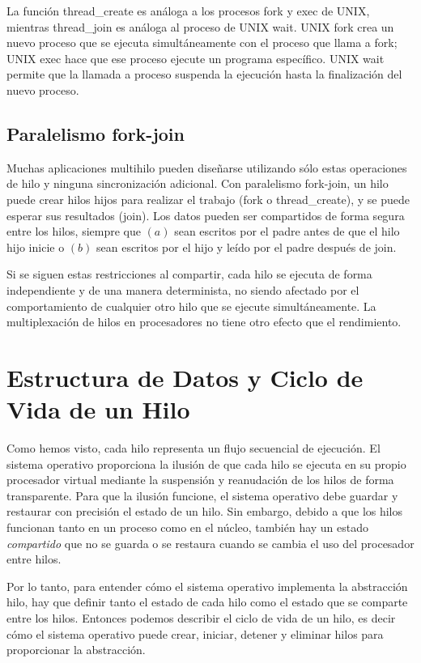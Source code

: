 \documentclass[10pt]{book}
\begin{document}
La función {\mf thread\_create} es análoga a los procesos {\mf fork} y {\mf exec} de UNIX, mientras {\mf thread\_join} es análoga al proceso de UNIX {\mf wait}. UNIX {\mf fork} crea un nuevo proceso que se ejecuta simultáneamente con el proceso que llama a {\mf fork}; UNIX {\mf exec} hace que ese proceso ejecute un programa específico. UNIX {\mf wait} permite que la llamada a proceso suspenda la ejecución hasta la finalización del nuevo proceso.

\subsection{Paralelismo fork-join}
Muchas aplicaciones multihilo pueden diseñarse utilizando sólo estas operaciones de hilo y ninguna sincronización adicional. Con paralelismo {\mf fork-join}, un hilo puede crear hilos hijos para realizar el trabajo ({\mf fork} o {\mf thread\_create}), y se puede esperar sus resultados ({\mf join}). Los datos pueden ser compartidos de forma segura entre los hilos, siempre que $(a)$ sean escritos por el padre antes de que el hilo hijo inicie o $(b)$ sean escritos por el hijo y leído por el padre después de {\mf join}.

Si se siguen estas restricciones al compartir, cada hilo se ejecuta de forma independiente y de una manera determinista, no siendo afectado por el comportamiento de cualquier otro hilo que se ejecute simultáneamente. La multiplexación de hilos en procesadores no tiene otro efecto que el rendimiento.

\section{Estructura de Datos y Ciclo de Vida de un Hilo}
Como hemos visto, cada hilo representa un flujo secuencial de ejecución. El sistema operativo proporciona la ilusión de que cada hilo se ejecuta en su propio procesador virtual mediante la suspensión y reanudación de los hilos de forma transparente. Para que la ilusión funcione, el sistema operativo debe guardar y restaurar con precisión el estado de un hilo. Sin embargo, debido a que los hilos funcionan tanto en un proceso como en el núcleo, también hay un estado \textit{compartido} que no se guarda o se restaura cuando se cambia el uso del procesador entre hilos.

Por lo tanto, para entender cómo el sistema operativo implementa la abstracción hilo, hay que definir tanto el estado de cada hilo como el estado que se comparte entre los hilos. Entonces podemos describir el ciclo de vida de un hilo, es decir cómo el sistema operativo puede crear, iniciar, detener y eliminar hilos para proporcionar la abstracción.
\end{document}
